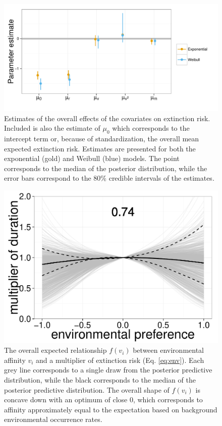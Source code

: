 \documentclass[12pt,letterpaper]{article}
\begin{document}
\begin{figure}[ht]
  \centering
  \includegraphics[height = 0.5\textheight,width=\textwidth,keepaspectratio=true]{figure/coef_means}
  \caption{Estimates of the overall effects of the covariates on extinction risk. Included is also the estimate of \(\mu_{0}\) which corresponds to the intercept term or, because of standardization, the overall mean expected extinction risk. Estimates are presented for both the exponential (gold) and Weibull (blue) models. The point corresponds to the median of the posterior distribution, while the error bars correspond to the 80\% credible intervals of the estimates.}
  \label{fig:mu}
\end{figure}

\begin{figure}[ht]
  \centering
  \includegraphics[height = 0.5\textheight,width=\textwidth,keepaspectratio=true]{figure/environ_quad}
  \caption{The overall expected relationship \(f(v_{i})\) between environmental affinity \(v_{i}\) and a multiplier of extinction risk (Eq. \ref{eq:env}). Each grey line corresponds to a single draw from the posterior predictive distribution, while the black corresponds to the median of the posterior predictive distribution. The overall shape of \(f(v_{i})\) is concave down with an optimum of close 0, which corresponds to affinity approximately equal to the expectation based on background environmental occurrence rates.}
  \label{fig:env_mean}
\end{figure}
\end{document}
